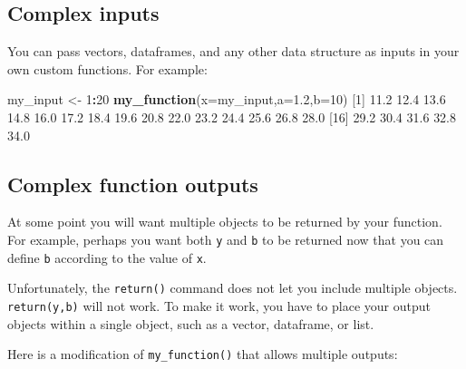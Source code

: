 \documentclass[
]{book}
\newenvironment{Shaded}{\begin{snugshade}}{\end{snugshade}}
\newcommand{\DataTypeTok}[1]{\textcolor[rgb]{0.13,0.29,0.53}{#1}}
\newcommand{\DecValTok}[1]{\textcolor[rgb]{0.00,0.00,0.81}{#1}}
\newcommand{\FloatTok}[1]{\textcolor[rgb]{0.00,0.00,0.81}{#1}}
\newcommand{\KeywordTok}[1]{\textcolor[rgb]{0.13,0.29,0.53}{\textbf{#1}}}
\newcommand{\NormalTok}[1]{#1}
\newcommand{\OperatorTok}[1]{\textcolor[rgb]{0.81,0.36,0.00}{\textbf{#1}}}
\newcommand{\StringTok}[1]{\textcolor[rgb]{0.31,0.60,0.02}{#1}}
\begin{document}
\hypertarget{complex-inputs}{%
\subsection*{Complex inputs}\label{complex-inputs}}

You can pass vectors, dataframes, and any other data structure as inputs in your own custom functions. For example:

\begin{Shaded}
\begin{Highlighting}[]
\NormalTok{my_input <-}\StringTok{ }\DecValTok{1}\OperatorTok{:}\DecValTok{20}
\KeywordTok{my_function}\NormalTok{(}\DataTypeTok{x=}\NormalTok{my_input,}\DataTypeTok{a=}\FloatTok{1.2}\NormalTok{,}\DataTypeTok{b=}\DecValTok{10}\NormalTok{)}
\NormalTok{ [}\DecValTok{1}\NormalTok{] }\FloatTok{11.2} \FloatTok{12.4} \FloatTok{13.6} \FloatTok{14.8} \FloatTok{16.0} \FloatTok{17.2} \FloatTok{18.4} \FloatTok{19.6} \FloatTok{20.8} \FloatTok{22.0} \FloatTok{23.2} \FloatTok{24.4} \FloatTok{25.6} \FloatTok{26.8} \FloatTok{28.0}
\NormalTok{[}\DecValTok{16}\NormalTok{] }\FloatTok{29.2} \FloatTok{30.4} \FloatTok{31.6} \FloatTok{32.8} \FloatTok{34.0}
\end{Highlighting}
\end{Shaded}

\hypertarget{complex-function-outputs}{%
\subsection*{Complex function outputs}\label{complex-function-outputs}}

At some point you will want multiple objects to be returned by your function. For example, perhaps you want both \texttt{y} and \texttt{b} to be returned now that you can define \texttt{b} according to the value of \texttt{x}.

Unfortunately, the \texttt{return()} command does not let you include multiple objects. \texttt{return(y,b)} will not work. To make it work, you have to place your output objects within a single object, such as a vector, dataframe, or list.

Here is a modification of \texttt{my\_function()} that allows multiple outputs:
\end{document}
